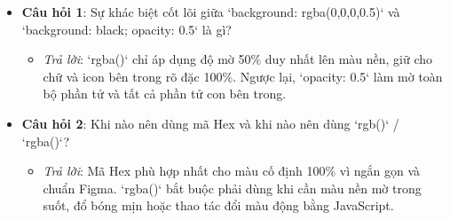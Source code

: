 \documentclass[11pt,oneside]{book}
\begin{document}
\begin{conceptBox}
\begin{itemize}[leftmargin=1.5em, itemsep=4pt, parsep=0pt]
    \item \textbf{Câu hỏi 1}: Sự khác biệt cốt lõi giữa `background: rgba(0,0,0,0.5)` và `background: black; opacity: 0.5` là gì?
    \begin{itemize}[leftmargin=1.2em]
        \item \textit{Trả lời}: `rgba()` chỉ áp dụng độ mờ 50\% duy nhất lên màu nền, giữ cho chữ và icon bên trong rõ đặc 100\%. Ngược lại, `opacity: 0.5` làm mờ toàn bộ phần tử và tất cả phần tử con bên trong.
    \end{itemize}
    \item \textbf{Câu hỏi 2}: Khi nào nên dùng mã Hex và khi nào nên dùng `rgb()` / `rgba()`?
    \begin{itemize}[leftmargin=1.2em]
        \item \textit{Trả lời}: Mã Hex phù hợp nhất cho màu cố định 100\% vì ngắn gọn và chuẩn Figma. `rgba()` bắt buộc phải dùng khi cần màu nền mờ trong suốt, đổ bóng mịn hoặc thao tác đổi màu động bằng JavaScript.
    \end{itemize}
\end{itemize}
\end{conceptBox}
\end{document}
